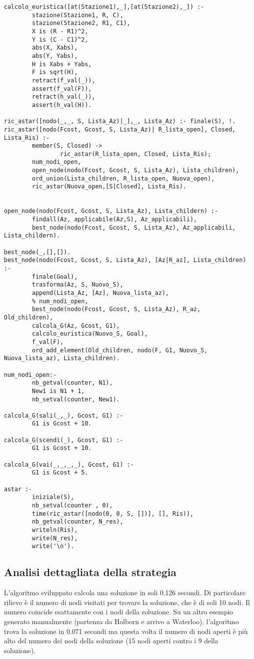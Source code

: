 \begin{lstlisting}
calcolo_euristica([at(Stazione1),_],[at(Stazione2),_]) :-
        stazione(Stazione1, R, C),
        stazione(Stazione2, R1, C1),
        X is (R - R1)^2,
        Y is (C - C1)^2,
        abs(X, Xabs),
        abs(Y, Yabs),
        H is Xabs + Yabs,
        F is sqrt(H),
        retract(f_val(_)),
        assert(f_val(F)),
        retract(h_val(_)),
        assert(h_val(H)).

ric_astar([nodo(_,_, S, Lista_Az)|_],_, Lista_Az) :- finale(S), !.
ric_astar([nodo(Fcost, Gcost, S, Lista_Az)| R_lista_open], Closed, Lista_Ris) :-
        member(S, Closed) ->
                ric_astar(R_lista_open, Closed, Lista_Ris);
        num_nodi_open,
        open_node(nodo(Fcost, Gcost, S, Lista_Az), Lista_children),
        ord_union(Lista_children, R_lista_open, Nuova_open),
        ric_astar(Nuova_open,[S|Closed], Lista_Ris).


open_node(nodo(Fcost, Gcost, S, Lista_Az), Lista_childern) :-
        findall(Az, applicabile(Az,S), Az_applicabili),
        best_node(nodo(Fcost, Gcost, S, Lista_Az), Az_applicabili, Lista_childern).

best_node(_,[],[]).
best_node(nodo(Fcost, Gcost, S, Lista_Az), [Az|R_az], Lista_children) :-
        finale(Goal),
        trasforma(Az, S, Nuovo_S),
        append(Lista_Az, [Az], Nuova_lista_az),
        % num_nodi_open,
        best_node(nodo(Fcost, Gcost, S, Lista_Az), R_az, Old_children),
        calcola_G(Az, Gcost, G1),
        calcolo_euristica(Nuovo_S, Goal),
        f_val(F),
        ord_add_element(Old_children, nodo(F, G1, Nuovo_S, Nuova_lista_az), Lista_children).

num_nodi_open:-
        nb_getval(counter, N1),
        New1 is N1 + 1,
        nb_setval(counter, New1).

calcola_G(sali(_,_), Gcost, G1) :-
        G1 is Gcost + 10.

calcola_G(scendi(_), Gcost, G1) :-
        G1 is Gcost + 10.

calcola_G(vai(_,_,_,_), Gcost, G1) :-
        G1 is Gcost + 5.

astar :-
        iniziale(S),
        nb_setval(counter , 0),
        time(ric_astar([nodo(0, 0, S, [])], [], Ris)),
        nb_getval(counter, N_res),
        writeln(Ris),
        write(N_res),
        write('\n').
\end{lstlisting}

\subsection{Analisi dettagliata della strategia}

L'algoritmo sviluppato calcola una soluzione in soli 0.126 secondi. Di particolare rilievo è il numero di nodi visitati per trovare la soluzione, che è di soli 10 nodi. Il numero coincide esattamente con i nodi della soluzione. Su un altro esempio generato manualmente (partenza da Holborn e arrivo a Waterloo), l'algoritmo trova la soluzione in 0.071 secondi ma questa volta il numero di nodi aperti è più alto del numero dei nodi della soluzione (15 nodi aperti contro i 9 della soluzione).
\newpage